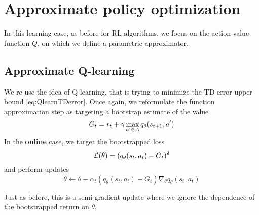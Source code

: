 \documentclass[../course-notes.tex]{subfiles}
\begin{document}
\section{Approximate policy optimization}

In this learning case, as before for RL algorithms, we focus on the action value function $Q$, on which we define a parametric approximator.


\subsection{Approximate Q-learning}

We re-use the idea of Q-learning, that is trying to minimize the TD error upper bound \eqref{eq:QlearnTDerror}. Once again, we reformulate the function approximation step as targeting a bootstrap estimate of the value
\[
	G_t = r_t + \gamma \max_{a'\in\mathcal{A}} q_\theta (s_{t+1}, a')
\]
In the \textbf{online} case, we target the bootstrapped loss
\[
	\mathcal{L}(\theta) = {(q_\theta(s_t,a_t) - G_t)}^2
\]
and perform updates
\begin{equation}
	\theta \leftarrow \theta - \alpha_t (q_\theta(s_t, a_t) - G_t)\nabla_\theta q_\theta(s_t, a_t)
\end{equation}

Just as before, this is a semi-gradient update where we ignore the dependence of the bootstrapped return on $\theta$.
\end{document}
